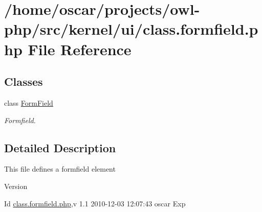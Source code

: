 \section{/home/oscar/projects/owl-\/php/src/kernel/ui/class.formfield.php File Reference}
\label{class_8formfield_8php}
\subsection*{Classes}
\begin{DoxyCompactItemize}
\item 
class \hyperlink{classFormField}{FormField}
\begin{DoxyCompactList}\small\item\em Formfield. \item\end{DoxyCompactList}\end{DoxyCompactItemize}


\subsection{Detailed Description}
This file defines a formfield element \begin{DoxyVersion}{Version}

\end{DoxyVersion}
\begin{DoxyParagraph}{Id}
\hyperlink{class_8formfield_8php}{class.formfield.php},v 1.1 2010-\/12-\/03 12:07:43 oscar Exp 
\end{DoxyParagraph}
